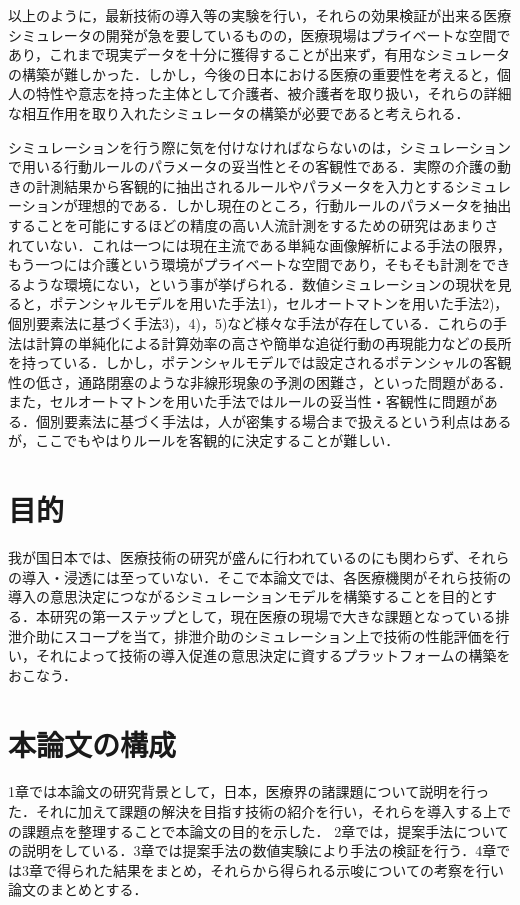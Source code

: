 以上のように，最新技術の導入等の実験を行い，それらの効果検証が出来る医療シミュレータの開発が急を要しているものの，医療現場はプライベートな空間であり，これまで現実データを十分に獲得することが出来ず，有用なシミュレータの構築が難しかった．しかし，今後の日本における医療の重要性を考えると，個人の特性や意志を持った主体として介護者、被介護者を取り扱い，それらの詳細な相互作用を取り入れたシミュレータの構築が必要であると考えられる．

シミュレーションを行う際に気を付けなければならないのは，シミュレーションで用いる行動ルールのパラメータの妥当性とその客観性である．実際の介護の動きの計測結果から客観的に抽出されるルールやパラメータを入力とするシミュレーションが理想的である．しかし現在のところ，行動ルールのパラメータを抽出することを可能にするほどの精度の高い人流計測をするための研究はあまりされていない．これは一つには現在主流である単純な画像解析による手法の限界，もう一つには介護という環境がプライベートな空間であり，そもそも計測をできるような環境にない，という事が挙げられる．数値シミュレーションの現状を見ると，ポテンシャルモデルを用いた手法1)，セルオートマトンを用いた手法2)，個別要素法に基づく手法3)，4)，5)など様々な手法が存在している．これらの手法は計算の単純化による計算効率の高さや簡単な追従行動の再現能力などの長所を持っている．しかし，ポテンシャルモデルでは設定されるポテンシャルの客観性の低さ，通路閉塞のような非線形現象の予測の困難さ，といった問題がある．また，セルオートマトンを用いた手法ではルールの妥当性・客観性に問題がある．個別要素法に基づく手法は，人が密集する場合まで扱えるという利点はあるが，ここでもやはりルールを客観的に決定することが難しい．

\section{目的}

我が国日本では、医療技術の研究が盛んに行われているのにも関わらず、それらの導入・浸透には至っていない．そこで本論文では、各医療機関がそれら技術の導入の意思決定につながるシミュレーションモデルを構築することを目的とする．本研究の第一ステップとして，現在医療の現場で大きな課題となっている排泄介助にスコープを当て，排泄介助のシミュレーション上で技術の性能評価を行い，それによって技術の導入促進の意思決定に資するプラットフォームの構築をおこなう．

\section{本論文の構成}

1章では本論文の研究背景として，日本，医療界の諸課題について説明を行った．それに加えて課題の解決を目指す技術の紹介を行い，それらを導入する上での課題点を整理することで本論文の目的を示した．
2章では，提案手法についての説明をしている．3章では提案手法の数値実験により手法の検証を行う．4章では3章で得られた結果をまとめ，それらから得られる示唆についての考察を行い論文のまとめとする．
